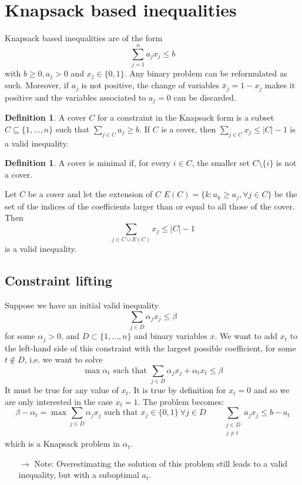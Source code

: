 \documentclass[11pt, openany]{report}
\theoremstyle{definition}
\newtheorem{definition}[thm]{Definition}
\begin{document}
\section{Knapsack based inequalities}
Knapsack based inequalities are of the form 
\begin{equation}
    \sum_{j=1}^n a_jx_j\le b
\end{equation}
with $b\ge0, a_j>0$ and $x_j\in \{0,1\}$. Any binary problem can be reformulated as such. Moreover, if $a_j$ is not positive, the change of variables $\bar x_j =1-x_j$ makes it positive and the variables associated to $a_j=0$ can be discarded. 
\begin{definition}
    A cover $C$ for a constraint in the Knapsack form is a subset $C\subseteq \{1,\dots,n\}$ such that $\sum_{j\in C}a_j\ge b$. If $C$ is a cover, then $\sum_{j\in C}x_j\le |C|-1$ is a valid inequality. 
\end{definition}
\begin{definition}
    A cover is minimal if, for every $i\in C$, the smaller set $C\setminus \{i\}$ is not a cover.
\end{definition}
Let $C$ be a cover and let the extension of $C$ $E(C) = \{k:a_k\ge a_j,\forall j\in C\}$ be the set of the indices of the coefficients larger than or equal to all those of the cover. Then
\begin{equation}
    \sum_{j\in C\cup E(C)} x_j\le |C|-1
\end{equation}
is a valid inequality. 
\subsection{Constraint lifting}
Suppose we have an initial valid inequality
\begin{equation}
    \sum_{j\in D}\alpha_jx_j \le \beta
\end{equation}
for some $\alpha_j>0$, and $D\subset \{1,\dots,n\}$ and binary variables $x$. We want to add $x_t$ to the left-hand side of this constraint with the largest possible coefficient, for some $t\not \in D$, i.e. we want to solve
\begin{equation}
    \max \alpha_t \text{ such that } \sum_{j\in D}\alpha_jx_j + \alpha_t x_t \le \beta 
\end{equation}
It must be true for any value of $x_t$. It is true by definition for $x_t=0$ and so we are only interested in the case $x_t=1$. The problem becomes:
\begin{equation}
    \beta -\alpha_t = \max \sum_{j\in D}\alpha_j x_j \text{ such that } x_j\in \{0,1\} \: \forall j\in D \qquad \sum_{\substack{j\in D\\j\neq t}} a_jx_j \le b-a_t
\end{equation}
which is a Knapsack problem in $\alpha_t$. 
\begin{itemize}
    \item [$\rightarrow$] Note: Overestimating the solution of this problem still leads to a valid inequality, but with a suboptimal $a_t$. 
\end{itemize}
\end{document}
